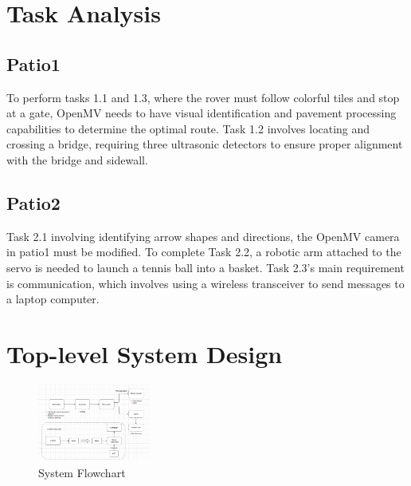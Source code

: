 \documentclass{solutionclass} %
\begin{document}
\section{Task Analysis}
    \subsection*{Patio1}
    To perform tasks 1.1 and 1.3, where the rover must follow colorful tiles and stop at a gate, OpenMV needs to have visual identification and pavement processing capabilities to determine the optimal route. Task 1.2 involves locating and crossing a bridge, requiring three ultrasonic detectors to ensure proper alignment with the bridge and sidewall.
    
    \subsection*{Patio2}
    Task 2.1 involving identifying arrow shapes and directions, the OpenMV camera in patio1 must be modified. To complete Task 2.2, a robotic arm attached to the servo is needed to launch a tennis ball into a basket. Task 2.3's main requirement is communication, which involves using a wireless transceiver to send messages to a laptop computer.
    
\section{Top-level System Design}

\begin{figure}
    \includegraphics[width=0.33\textwidth]{figure/dia_o.png}
  \caption{System Flowchart}
  \label{diag}
\end{figure}
\end{document}

